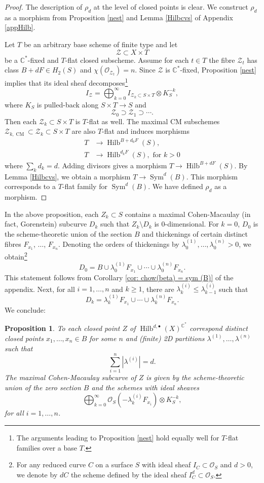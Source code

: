 \documentclass{amsart}
\newtheorem{proposition}[theorem]{Proposition}
\theoremstyle{definition}
\newcommand{\CC} {\mathbb{C}}          %
\renewcommand{\O}{\mathcal{O}}
\newcommand{\Z}{\mathcal{Z}}
\newcommand{\Sym}{\operatorname{Sym}}
\newcommand{\Hilb}{\operatorname{Hilb}}
\newcommand{\CM}{\operatorname{CM}}
\begin{document}
\begin{proof}
The description of $\rho_d$ at the level of closed points is clear. We construct $\rho_d$ as a morphism from Proposition \ref{nest} and Lemma \ref{Hilbcvs} of Appendix \ref{appHilb}.

Let $T$ be an arbitrary base scheme of finite type and let 
$$
\Z \subset X \times T
$$
be a $\CC^*$-fixed and $T$-flat closed subscheme. Assume for each $t \in T$ the fibre $\Z_t$ has class $B+dF \in H_2(S)$ and $\chi(\O_{\Z_t}) = n$. Since $\Z$ is $\CC^*$-fixed, Proposition \ref{nest} implies that its ideal sheaf decomposes\footnote{The arguments leading to Proposition \ref{nest} hold equally well for $T$-flat families over a base $T$.}
$$
I_{\Z} = \bigoplus_{k = 0}^{\infty} I_{\Z_k \subset S \times T} \otimes K_{S}^{-k},
$$
where $K_{S}$ is pulled-back along $S \times T \rightarrow S$ and 
$$
\Z_0 \supset \Z_1 \supset \cdots.
$$
Then each $\Z_k \subset S \times T$ is $T$-flat as well. The maximal
CM subschemes $\Z_{k, \CM} \subset \Z_k \subset S \times T$ are also
$T$-flat and induces morphisms
\begin{align*}
T &\longrightarrow \Hilb^{B + d_0 F}(S), \\ 
T &\longrightarrow \Hilb^{d_k F}(S),  \textrm{ \ for \ } k>0
\end{align*}
where $\sum_k d_k = d$. Adding divisors gives a morphism $T \longrightarrow \Hilb^{B+dF}(S)$. By Lemma \ref{Hilbcvs}, we obtain a morphism $T \rightarrow \Sym^d(B)$. This morphism corresponds to a $T$-flat family for $\Sym^d(B)$. We have defined $\rho_d$ as a morphism. 
\end{proof}

In the above proposition, each $Z_k \subset S$ contains a maximal Cohen-Macaulay (in fact, Gorenstein) subcurve $D_k$ such that $Z_k \setminus D_k$ is 0-dimensional. For $k=0$, $D_0$ is the scheme-theoretic union of the section $B$ and thickenings of certain distinct fibres $F_{x_1}$, $\ldots$, $F_{x_n}$. Denoting the orders of thickenings by $\lambda_{0}^{(1)}, \ldots, \lambda_{0}^{(n)} > 0$, we obtain\footnote{For any reduced curve $C$ on a surface $S$ with ideal sheaf $I_C \subset \O_S$ and $d>0$, we denote by $d C$ the scheme defined by the ideal sheaf $I_{C}^{d} \subset \O_S$.}
$$
D_0 = B \cup \lambda_{0}^{(1)} F_{x_1} \cup \cdots \cup \lambda_{0}^{(n)} F_{x_n}.
$$
This statement follows from Corollary \ref{cor: chow(beta) = sym (B)} of the appendix. Next, for all $i = 1, \ldots, n$ and $k \geq 1$, there are $\lambda_{k}^{(i)} \leq \lambda_{k-1}^{(i)}$ such that
$$
D_k = \lambda_{k}^{(1)} F_{x_1} \cup \cdots \cup \lambda_{k}^{(n)} F_{x_n}.
$$
We conclude:
\begin{proposition} \label{ZCM}
To each closed point $Z$ of $\Hilb^{d,\bullet}(X)^{\CC^*}$ correspond distinct closed points $x_1, \ldots, x_n \in B$ for some $n$ and (finite) 2D partitions $\lambda^{(1)}, \ldots, \lambda^{(n)}$ such that
$$
\sum_{i=1}^{n} |\lambda^{(i)}| = d.
$$
The maximal Cohen-Macaulay subcurve of $Z$ is given by the scheme-theoretic union of the zero section $B$ and the schemes with ideal sheaves
$$
\bigoplus_{k=0}^{\infty} \O_{S}(-\lambda_{k}^{(i)} F_{x_i}) \otimes K_{S}^{-k},
$$
for all $i = 1, \ldots, n$.
\end{proposition}
\end{document}
